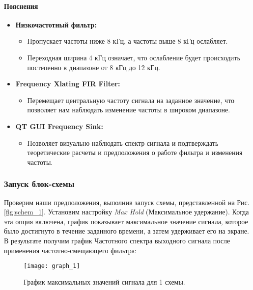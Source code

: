 \documentclass[a4paper,12pt]{extarticle}
\begin{document}
\paragraph{Пояснения}
\begin{itemize}

    \item \textbf{Низкочастотный фильтр:}
    \begin{itemize}
        \item Пропускает частоты ниже 8 кГц, а частоты выше 8 кГц ослабляет.
        \item Переходная ширина 4 кГц означает, что ослабление будет происходить постепенно в диапазоне от 8 кГц до 12 кГц.
    \end{itemize}

    \item \textbf{Frequency Xlating FIR Filter:}
    \begin{itemize}
        \item Перемещает центральную частоту сигнала на заданное значение, что позволяет нам наблюдать изменение частоты в широком диапазоне.
    \end{itemize}

    \item \textbf{QT GUI Frequency Sink:}
    \begin{itemize}
        \item Позволяет визуально наблюдать спектр сигнала и подтверждать теоретические расчеты и предположения о работе фильтра и изменения частоты.
    \end{itemize}

\end{itemize}

\subsubsection{Запуск блок-схемы}
\hspace{1.15cm}Проверим наши предположения, выполнив запуск схемы, представленной на Рис. 
\ref{fig:schem_1}. Установим настройку \textit{Max Hold} (Максимальное удержание). 
Когда эта опция включена, график показывает максимальное значение сигнала, которое было 
достигнуто в течение заданного времени, а затем удерживает его на экране. В результате получим 
график Частотного спектра выходного сигнала после применения частотно-смещающего фильтра:\\
\begin{figure}[H]
    \centering
    \texttt{[image: graph\_1]}
    \caption{График максимальных значений сигнала для 1 схемы.} %
    \label{fig:graph_1} %
\end{figure}
\end{document}
